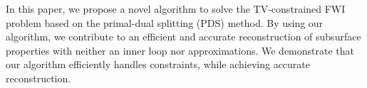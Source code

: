 In this paper, we propose a novel algorithm to solve the TV-constrained FWI problem based on the primal-dual splitting (PDS) method.
By using our algorithm, we contribute to an efficient and accurate reconstruction of subsurface properties with neither an inner loop nor approximations.
We demonstrate that our algorithm efficiently handles constraints, while achieving accurate reconstruction.





